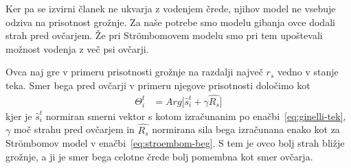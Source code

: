 Ker pa se izvirni članek ne ukvarja z vodenjem črede, njihov model ne vsebuje odziva na prisotnost grožnje. Za naše potrebe smo modelu gibanja ovce dodali strah pred ovčarjem. Že pri Str{\"o}mbomovem modelu smo pri tem upoštevali možnost vodenja z več psi ovčarji.

Ovca naj gre v primeru prisotnosti grožnje na razdalji največ $r_s$ vedno v stanje teka. Smer bega pred ovčarji v primeru njegove prisotnosti določimo kot
\begin{align}
\Theta_i^t&=Arg\lbrack \hat{s}_i^t+\gamma\hat{R_s}\rbrack\label{eq:ginelli-beg}
\end{align}
kjer je $\hat{s}_i^t$ normiran smerni vektor s kotom izračunanim po enačbi~\eqref{eq:ginelli-tek}, $\gamma$ moč strahu pred ovčarjem in $\hat{R_s}$ normirana sila bega izračunana enako kot za Str{\"o}mbomov model v enačbi~\eqref{eq:stroembom-beg}. S tem je ovco bolj strah bližje grožnje, a ji je smer bega celotne črede bolj pomembna kot smer ovčarja.
